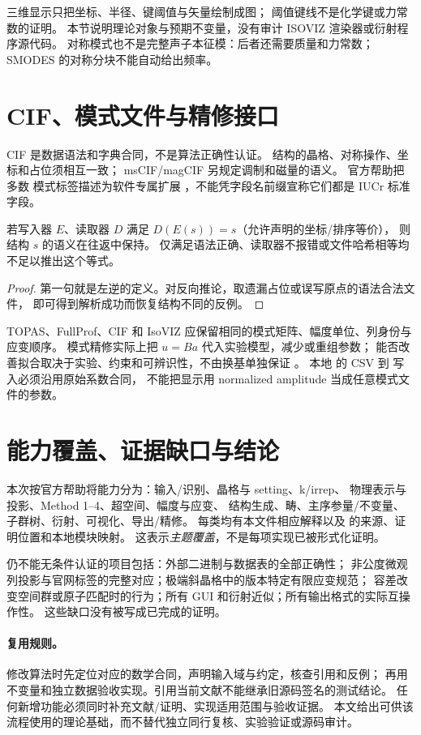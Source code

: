 三维显示只把坐标、半径、键阈值与矢量绘制成图；
阈值键线不是化学键或力常数的证明。
本节说明理论对象与预期不变量，没有审计 ISOVIZ 渲染器或衍射程序源代码。
对称模式也不是完整声子本征模：后者还需要质量和力常数；
SMODES 的对称分块不能自动给出频率\citep{Frozen1995,SmodesManual}。

\section{CIF、模式文件与精修接口}\label{sec:formats}
CIF 是数据语法和字典合同，不是算法正确性认证。
结构的晶格、对称操作、坐标和占位须相互一致；
msCIF/magCIF 另规定调制和磁量的语义\citep{CifSpec,CifCore,CifMs,CifMag}。
官方帮助把多数  模式标签描述为软件专属扩展
\citep{OfficialHelp}，不能凭字段名前缀宣称它们都是 IUCr 标准字段。

\begin{proposition}[可逆序列化的必要合同]
若写入器 $E$、读取器 $D$ 满足 $D(E(s))=s$（允许声明的坐标/排序等价），
则结构 $s$ 的语义在往返中保持。
仅满足语法正确、读取器不报错或文件哈希相等均不足以推出这个等式。
\end{proposition}
\begin{proof}
第一句就是左逆的定义。对反向推论，取遗漏占位或误写原点的语法合法文件，
即可得到解析成功而恢复结构不同的反例。
\end{proof}
TOPAS、FullProf、CIF 和 IsoVIZ 应保留相同的模式矩阵、幅度单位、列身份与应变顺序。
模式精修实际上把 $u=B a$ 代入实验模型，减少或重组参数；
能否改善拟合取决于实验、约束和可辨识性，不由换基单独保证
\citep{Refinement2007,Kerman2012}。
本地  的 CSV 到  写入必须沿用原始系数合同，
不能把显示用 normalized amplitude 当成任意模式文件的参数。

\section{能力覆盖、证据缺口与结论}
本次按官方帮助将能力分为：输入/识别、晶格与 setting、k/irrep、
物理表示与投影、Method 1--4、超空间、幅度与应变、
结构生成、畴、主序参量/不变量、子群树、衍射、可视化、导出/精修。
每类均有本文件相应解释以及  的来源、证明位置和本地模块映射。
这表示\emph{主题覆盖}，不是每项实现已被形式化证明。

仍不能无条件认证的项目包括：外部二进制与数据表的全部正确性；
非公度微观列投影与官网标签的完整对应；极端斜晶格中的版本特定有限应变规范；
容差改变空间群或原子匹配时的行为；所有 GUI 和衍射近似；所有输出格式的实际互操作性。
这些缺口没有被写成已完成的证明。

\paragraph{复用规则。}
修改算法时先定位对应的数学合同，声明输入域与约定，核查引用和反例；
再用不变量和独立数据验收实现。引用当前文献不能继承旧源码签名的测试结论。
任何新增功能必须同时补充文献/证明、实现适用范围与验收证据。
本文给出可供该流程使用的理论基础，而不替代独立同行复核、实验验证或源码审计。




